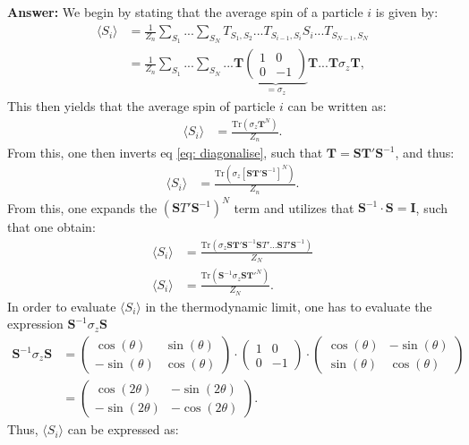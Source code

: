 \documentclass[a4paper]{article}
\newcommand{\trace}{\text{Tr}}
\newcommand{\newparagraph}{\vspace{.5cm}\noindent}
\newcommand{\average}[1]{\langle #1 \rangle}
\begin{document}
\newparagraph
\textbf{Answer:} We begin by stating that the average spin of a particle $i$ is given by:
\begin{align*}
    \average{S_i} &=\frac{1}{Z_n}\sum_{S_1}...\sum_{S_{N}}T_{S_1, S_2}...T_{S_{i-1}, S_{i}}S_i... T_{S_{N-1}, S_N}\\
    &= \frac{1}{Z_n}\sum_{S_1}...\sum_{S_N}...\mathbf{T}\underbrace{\begin{pmatrix}1&0\\0&-1\end{pmatrix}}_{=\sigma_z}\mathbf{T}...\mathbf{T}\sigma_z\mathbf{T},
\end{align*}This then yields that the average spin of particle $i$ can be written as:
\begin{align*}
    \average{S_i} &=\frac{\trace\left(\sigma_z\mathbf{T}^N\right)}{Z_n}.
\end{align*}From this, one then inverts eq \eqref{eq: diagonalise}, such that $\mathbf{T} = \mathbf{S}\mathbf{T}'\mathbf{S}^{-1}$, and thus:
\begin{align*}
    \average{S_i} &= \frac{\trace\left(\sigma_z \left[\mathbf{S}\mathbf{T}'\mathbf{S}^{-1}\right]^N\right)}{Z_n}.
\end{align*}From this, one expands the $(\mathbf{S}T'\mathbf{S}^{-1})^N$ term and utilizes that $\mathbf{S}^{-1}\cdot\mathbf{S} = \mathbf{I}$, such that one obtain:
\begin{align*}
    \average{S_i} &= \frac{\trace\left(\sigma_z\mathbf{S}\mathbf{T}'\mathbf{S}^{-1}\mathbf{S}T'...\mathbf{S}T'\mathbf{S}^{-1}\right)}{Z_N}\\
    \average{S_i} &= \frac{\trace\left(\mathbf{S}^{-1}\sigma_z\mathbf{S}\mathbf{T}'^N\right)}{Z_N}.
\end{align*}In order to evaluate $\average{S_i}$ in the thermodynamic limit, one has to evaluate the expression $\mathbf{S}^{-1}\sigma_z\mathbf{S}$
\begin{align*}
    \mathbf{S}^{-1}\sigma_z\mathbf{S} &= \begin{pmatrix}
        \cos(\theta) & \sin(\theta)\\
        -\sin(\theta) &\cos(\theta)
    \end{pmatrix}\cdot\begin{pmatrix}
        1 & 0 \\
        0 & -1
    \end{pmatrix}\cdot\begin{pmatrix}
        \cos(\theta) & -\sin(\theta)\\
        \sin(\theta) &\cos(\theta)
    \end{pmatrix}\\ &= \begin{pmatrix}
        \cos(2\theta) & -\sin(2\theta)\\
        -\sin(2\theta) &-\cos(2\theta)
    \end{pmatrix}.
\end{align*}Thus, $\average{S_i}$ can be expressed as:
\end{document}
